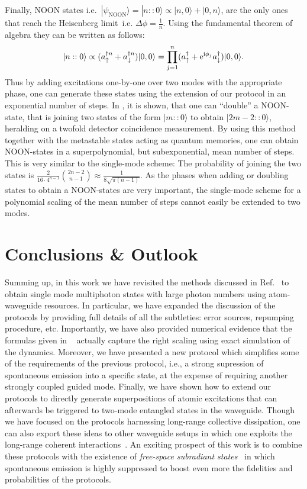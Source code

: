 \documentclass[twocolumn,pra,aps,superscriptaddress,showpacs]{revtex4-1}
\newcommand{\ket}[1]{|#1\rangle}
\def\ee{\mathord{\rm e}}
\def\ii{\mathord{\rm i}}
\begin{document}
Finally, NOON states i.e.~$\ket{\psi_\mathrm{NOON}} = \ket{n::0} \propto \ket{n,0} + \ket{0,n}$, are the only ones that reach the Heisenberg limit~i.e. $\Delta \phi = \frac{1}{n}$. Using the fundamental theorem of algebra they can be written as follows:
\begin{equation}
	\ket{n::0} 
	\propto (a_\uparrow^{\dagger n} + a_\downarrow^{\dagger n} ) \ket{0,0} 
	= \prod_{j=1}^n (a_\uparrow^\dagger + \ee^{\ii \phi_j} a_\downarrow^\dagger ) \ket{0,0}.
\end{equation}
Thus by adding excitations one-by-one over two modes with the appropriate phase, one can generate these states using the extension of our protocol in an exponential number of steps.
In \cite{kok02}, it is shown, that one can ``double'' a NOON-state, that is joining two states of the form $\ket{m::0}$ to obtain $\ket{2m-2::0}$, heralding on a twofold detector coincidence measurement. By using this method together with the metastable states acting as quantum memories, one can obtain NOON-states in a superpolynomial, but subexponential, mean number of steps. This is very similar to the single-mode scheme: The probability of joining the two states is $\frac{2}{16 \cdot 4^{n-1}} \binom{2n-2}{n-1} \approx \frac{1}{8 \sqrt{\pi(n-1)}}$.
As the phases when adding or doubling states to obtain a NOON-states are very important, the single-mode scheme for a polynomial scaling of the mean number of steps cannot easily be extended to two modes.

\section{Conclusions \& Outlook}\label{sec:outlook}

Summing up, in this work we have revisited the methods discussed in Ref.~\cite{gonzaleztudela17a} to obtain single mode multiphoton states with large photon numbers using atom-waveguide resources. In particular, we have expanded the discussion of the protocols by providing full details of all the subtleties: error sources, repumping procedure, etc. Importantly, we have also provided numerical evidence that the formulas given in ~\cite{gonzaleztudela17a} actually capture the right scaling using exact simulation of the dynamics. Moreover, we have presented a new protocol which simplifies some of the requirements of the previous protocol, i.e., a strong supression of spontaneous emission into a specific state, at the expense of requiring another strongly coupled guided mode. Finally, we have shown how to extend our protocols to directly generate superpositions of atomic excitations that can afterwards be triggered to two-mode entangled states in the waveguide. Though we have focused on the protocols harnessing long-range collective dissipation, one can also export these ideas to other waveguide setups in which one exploits the long-range coherent interactions~\cite{paulisch17a}. An exciting prospect of this work is to combine these protocols with the existence of \emph{free-space subradiant states}~\cite{porras08a,asenjogarcia17a} in which spontaneous emission is highly suppressed to boost even more the fidelities and probabilities of the protocols.
\end{document}
